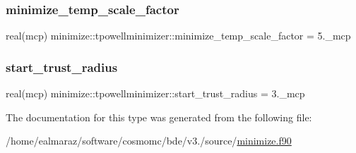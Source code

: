 \subsubsection{\texorpdfstring{minimize\+\_\+temp\+\_\+scale\+\_\+factor}{minimize\_temp\_scale\_factor}}
{\footnotesize\ttfamily real(mcp) minimize\+::tpowellminimizer\+::minimize\+\_\+temp\+\_\+scale\+\_\+factor = 5.\+\_\+mcp\hspace{0.3cm}{\ttfamily [private]}}

\mbox{\label{structminimize_1_1tpowellminimizer_a8f50bf0b17a2543ab12aa1bcd4fd89db}} 
\subsubsection{\texorpdfstring{start\+\_\+trust\+\_\+radius}{start\_trust\_radius}}
{\footnotesize\ttfamily real(mcp) minimize\+::tpowellminimizer\+::start\+\_\+trust\+\_\+radius = 3.\+\_\+mcp\hspace{0.3cm}{\ttfamily [private]}}



The documentation for this type was generated from the following file\+:\begin{DoxyCompactItemize}
\item 
/home/ealmaraz/software/cosmomc/bde/v3./source/\mbox{\hyperlink{minimize_8f90}{minimize.\+f90}}\end{DoxyCompactItemize}
